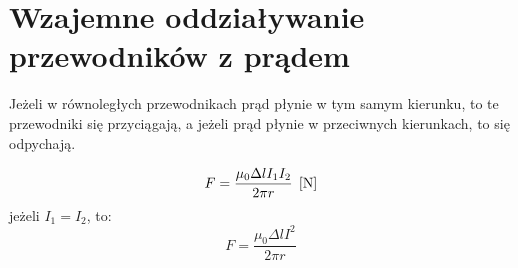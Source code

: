   \section{Wzajemne oddziaływanie przewodników z prądem}
    Jeżeli w równoległych przewodnikach prąd płynie w tym samym kierunku, to te przewodniki się przyciągają, a jeżeli prąd płynie w przeciwnych kierunkach, to się odpychają.
    \begin{center}
      \begin{tikzpicture}
      \end{tikzpicture}
    \end{center}
    \begin{equation}
      F = \frac{\mu_0\Delta lI_1I_2}{2\pi r} \unit N
    \end{equation}
    jeżeli $I_1 = I_2$, to:
    \begin{equation*}
      F = \frac{\mu_0\Delta lI^2}{2\pi r}
    \end{equation*}
